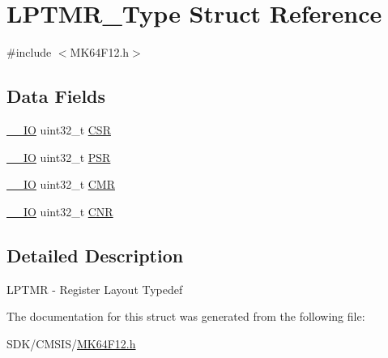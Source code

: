 \hypertarget{struct_l_p_t_m_r___type}{}\section{L\+P\+T\+M\+R\+\_\+\+Type Struct Reference}
\label{struct_l_p_t_m_r___type}


{\ttfamily \#include $<$M\+K64\+F12.\+h$>$}

\subsection*{Data Fields}
\begin{DoxyCompactItemize}
\item 
\mbox{\hyperlink{core__cm4_8h_aec43007d9998a0a0e01faede4133d6be}{\+\_\+\+\_\+\+IO}} uint32\+\_\+t \mbox{\hyperlink{group___v_r_e_f___peripheral___access___layer_ga876dd0a8546697065f406b7543e27af2}{C\+SR}}
\item 
\mbox{\hyperlink{core__cm4_8h_aec43007d9998a0a0e01faede4133d6be}{\+\_\+\+\_\+\+IO}} uint32\+\_\+t \mbox{\hyperlink{group___v_r_e_f___peripheral___access___layer_ga909d70d4d88dd6731a07b76a21c8214b}{P\+SR}}
\item 
\mbox{\hyperlink{core__cm4_8h_aec43007d9998a0a0e01faede4133d6be}{\+\_\+\+\_\+\+IO}} uint32\+\_\+t \mbox{\hyperlink{group___v_r_e_f___peripheral___access___layer_ga3fbfa42319981886e98899e3ee069f81}{C\+MR}}
\item 
\mbox{\hyperlink{core__cm4_8h_aec43007d9998a0a0e01faede4133d6be}{\+\_\+\+\_\+\+IO}} uint32\+\_\+t \mbox{\hyperlink{group___v_r_e_f___peripheral___access___layer_gafabfe869c2da8a9974cac1da36481312}{C\+NR}}
\end{DoxyCompactItemize}


\subsection{Detailed Description}
L\+P\+T\+MR -\/ Register Layout Typedef 

The documentation for this struct was generated from the following file\+:\begin{DoxyCompactItemize}
\item 
S\+D\+K/\+C\+M\+S\+I\+S/\mbox{\hyperlink{_m_k64_f12_8h}{M\+K64\+F12.\+h}}\end{DoxyCompactItemize}
